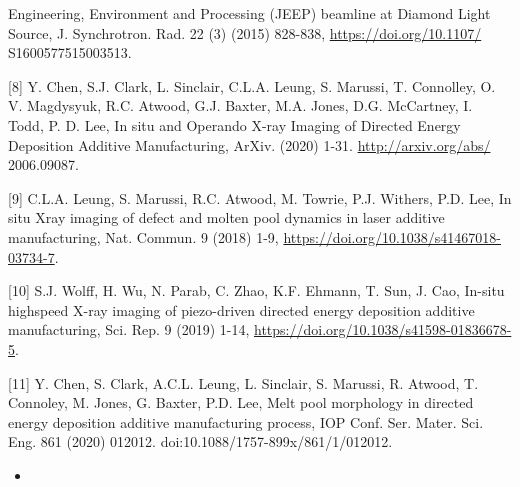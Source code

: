 \documentclass[10pt]{article}
\begin{document}
Engineering, Environment and Processing (JEEP) beamline at Diamond Light Source, J. Synchrotron. Rad. 22 (3) (2015) 828-838, \href{https://doi.org/10.1107/}{https://doi.org/10.1107/} S1600577515003513.

[8] Y. Chen, S.J. Clark, L. Sinclair, C.L.A. Leung, S. Marussi, T. Connolley, O. V. Magdysyuk, R.C. Atwood, G.J. Baxter, M.A. Jones, D.G. McCartney, I. Todd, P. D. Lee, In situ and Operando X-ray Imaging of Directed Energy Deposition Additive Manufacturing, ArXiv. (2020) 1-31. \href{http://arxiv.org/abs/}{http://arxiv.org/abs/} 2006.09087.

[9] C.L.A. Leung, S. Marussi, R.C. Atwood, M. Towrie, P.J. Withers, P.D. Lee, In situ Xray imaging of defect and molten pool dynamics in laser additive manufacturing, Nat. Commun. 9 (2018) 1-9, \href{https://doi.org/10.1038/s41467018-03734-7}{https://doi.org/10.1038/s41467018-03734-7}.

[10] S.J. Wolff, H. Wu, N. Parab, C. Zhao, K.F. Ehmann, T. Sun, J. Cao, In-situ highspeed X-ray imaging of piezo-driven directed energy deposition additive manufacturing, Sci. Rep. 9 (2019) 1-14, \href{https://doi.org/10.1038/s41598-01836678-5}{https://doi.org/10.1038/s41598-01836678-5}.

[11] Y. Chen, S. Clark, A.C.L. Leung, L. Sinclair, S. Marussi, R. Atwood, T. Connoley, M. Jones, G. Baxter, P.D. Lee, Melt pool morphology in directed energy deposition additive manufacturing process, IOP Conf. Ser. Mater. Sci. Eng. 861 (2020) 012012. doi:10.1088/1757-899x/861/1/012012.

\begin{itemize}
  \item 
\end{itemize}
\end{document}
